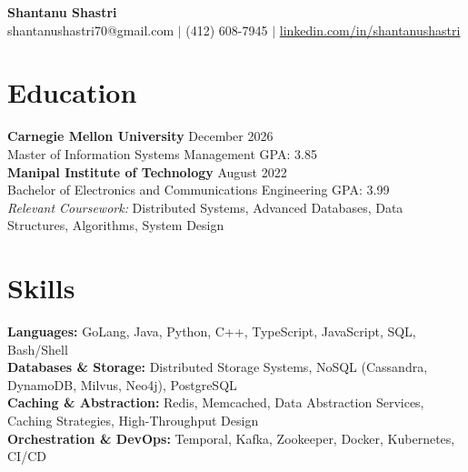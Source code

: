 \documentclass[11pt,a4paper]{article}
\begin{document}
\begin{center}
    \Huge \textbf{Shantanu Shastri} \\
    \vspace{2pt}
    \small shantanushastri70@gmail.com $|$ (412) 608-7945 $|$ \href{https://linkedin.com/in/shantanushastri}{linkedin.com/in/shantanushastri}
\end{center}

\vspace{-5pt}
\section{Education}
\noindent
\textbf{Carnegie Mellon University} \hfill December 2026 \\
Master of Information Systems Management \hfill GPA: 3.85 \\
\textbf{Manipal Institute of Technology} \hfill August 2022 \\
Bachelor of Electronics and Communications Engineering \hfill GPA: 3.99 \\
\textit{Relevant Coursework:} Distributed Systems, Advanced Databases, Data Structures, Algorithms, System Design

\vspace{-5pt}
\section{Skills}
\noindent
\textbf{Languages:} GoLang, Java, Python, C++, TypeScript, JavaScript, SQL, Bash/Shell \\
\textbf{Databases \& Storage:} Distributed Storage Systems, NoSQL (Cassandra, DynamoDB, Milvus, Neo4j), PostgreSQL \\
\textbf{Caching \& Abstraction:} Redis, Memcached, Data Abstraction Services, Caching Strategies, High-Throughput Design \\
\textbf{Orchestration \& DevOps:} Temporal, Kafka, Zookeeper, Docker, Kubernetes, CI/CD

\vspace{-5pt}
\end{document}
